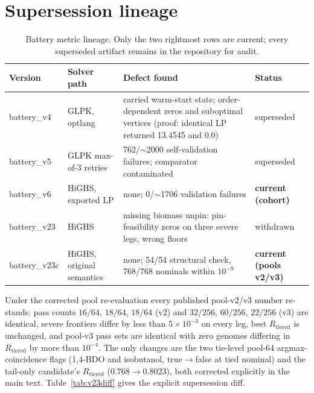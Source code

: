 \documentclass[12pt,a4paper]{article}
\begin{document}
\section{Supersession lineage}
\begin{table}[h]
\centering
\small
\caption{Battery metric lineage. Only the two rightmost rows are current; every superseded artifact remains in the repository for audit.}
\label{tab:lineage}
\footnotesize
\begin{tabular}{l l p{5.4cm} l}
\hline
Version & Solver path & Defect found & Status \\
\hline
battery\_v4 & GLPK, optlang & carried warm-start state; order-dependent zeros and suboptimal vertices (proof: identical LP returned 13.4545 and 0.0) & superseded \\
battery\_v5 & GLPK max-of-3 retries & 762/$\sim$2000 self-validation failures; comparator contaminated & superseded \\
battery\_v6 & HiGHS, exported LP & none; 0/$\sim$1706 validation failures & \textbf{current (cohort)} \\
battery\_v23 & HiGHS & missing biomass unpin: pin-feasibility zeros on three severe legs, wrong floors & withdrawn \\
battery\_v23c & HiGHS, original semantics & none; 54/54 structural check, 768/768 nominals within $10^{-9}$ & \textbf{current (pools v2/v3)} \\
\hline
\end{tabular}
\end{table}

Under the corrected pool re-evaluation every published pool-v2/v3 number re-stands: pass counts $16/64$, $18/64$, $18/64$ (v2) and $32/256$, $60/256$, $22/256$ (v3) are identical, severe frontiers differ by less than $5\times10^{-3}$ on every leg, best $R_{\mathrm{tiered}}$ is unchanged, and pool-v3 pass sets are identical with zero genomes differing in $R_{\mathrm{tiered}}$ by more than $10^{-4}$. The only changes are the two tie-level pool-64 argmax-coincidence flags (1,4-BDO and isobutanol, true$\to$false at tied nominal) and the tail-only candidate's $R_{\mathrm{tiered}}$ ($0.768 \to 0.8023$), both corrected explicitly in the main text. Table~\ref{tab:v23diff} gives the explicit supersession diff.
\end{document}
